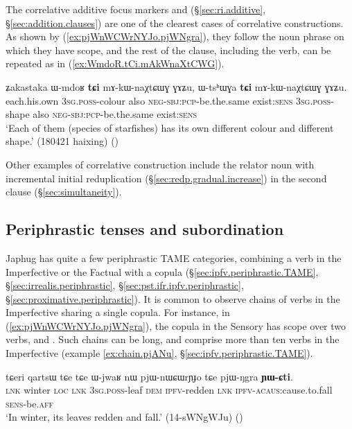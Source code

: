 The correlative additive focus markers  and  (§\ref{sec:ri.additive}, §\ref{sec:addition.clauses}) are one of the clearest cases of correlative constructions. As shown by (\ref{ex:pjWnWCWrNYJo.pjWNgra}), they follow the noun phrase on which they have scope, and the rest of the clause, including the verb, can be repeated as in (\ref{ex:WmdoR.tCi.mAkWnaXtCWG}).


\begin{exe}
\ex \label{ex:WmdoR.tCi.mAkWnaXtCWG}
\gll ʑakastaka ɯ-mdoʁ \textbf{tɕi} mɤ-kɯ-naχtɕɯɣ ɣɤʑu, ɯ-tsʰɯɣa \textbf{tɕi} mɤ-kɯ-naχtɕɯɣ ɣɤʑu. \\
each.his.own \textsc{3sg}.\textsc{poss}-colour also \textsc{neg}-\textsc{sbj}:\textsc{pcp}-be.the.same exist:\textsc{sens} \textsc{3sg}.\textsc{poss}-shape also \textsc{neg}-\textsc{sbj}:\textsc{pcp}-be.the.same exist:\textsc{sens} \\
\glt `Each of them (species of starfishes) has its own different colour and different shape.' (180421 haixing)
()
\end{exe}

Other examples of correlative construction include the relator noun  with incremental initial reduplication (§\ref{sec:redp.gradual.increase}) in the second clause (§\ref{sec:simultaneity}).

\subsection{Periphrastic tenses and subordination}   \label{sec:periphrastic.subordination}
Japhug has quite a few periphrastic TAME categories, combining a verb in the Imperfective or the Factual with a copula (§\ref{sec:ipfv.periphrastic.TAME}, §\ref{sec:irrealis.periphrastic}, §\ref{sec:pst.ifr.ipfv.periphrastic}, §\ref{sec:proximative.periphrastic}). It is common to observe chains of verbs in the Imperfective sharing a single copula. For instance, in (\ref{ex:pjWnWCWrNYJo.pjWNgra}), the copula  in the Sensory has scope over two verbs,  and . Such chains can be long, and comprise more than ten verbs in the Imperfective (example \ref{ex:chain.pjANu}, §\ref{sec:ipfv.periphrastic.TAME}).


\begin{exe}
\ex \label{ex:pjWnWCWrNYJo.pjWNgra}
\gll tɕeri qartsɯ tɕe tɕe ɯ-jwaʁ nɯ pjɯ-nɯɕɯrɲɟo tɕe pjɯ-ŋgra \textbf{ɲɯ-ɕti}. \\
\textsc{lnk} winter \textsc{loc} \textsc{lnk} \textsc{3sg}.\textsc{poss}-leaf \textsc{dem} \textsc{ipfv}-redden \textsc{lnk} \textsc{ipfv}-\textsc{acaus}:cause.to.fall \textsc{sens}-be.\textsc{aff} \\
\glt `In winter, its leaves redden and fall.' (14-sWNgWJu)
()
\end{exe}   


